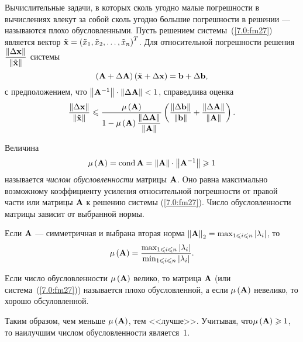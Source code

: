 \documentclass[12pt]{article}
\DeclareMathOperator{\cond}{cond}
\newcommand{\norm}[1]{\left\| #1 \right\|}
\begin{document}
	Вычислительные задачи, в которых сколь угодно малые погрешности в вычислениях влекут за собой сколь угодно большие погрешности в решении --- называются плохо обусловленными. Пусть решением системы~(\ref{7.0:fm27}) является вектор $\tilde{\bold{x}}=\left(\tilde{x}_1, \tilde{x}_2,\ldots, \tilde{x}_n\right)^T$. Для относительной погрешности решения $\dfrac{\norm{\Delta\bold{x}}}{\norm{\tilde{\bold{x}}}}$ системы
	\begin{equation}
		\left(\bold{A}+\Delta\bold{A}\right)\left(\tilde{\bold{x}}+\Delta \bold{x}\right)=\bold{b}+\Delta\bold{b},
	\end{equation}
	с предположением, что $\norm{\bold{A}^{-1}}\cdot\norm{\Delta\bold{A}}<1$,
	справедлива оценка
	\begin{equation}
		\dfrac{\norm{\Delta \bold{x}}}{\norm{\tilde{\bold{x}}}}\leqslant\dfrac{\mu\left(\bold{A}\right)}{1-\mu\left(\bold{A}\right)\dfrac{\norm{\Delta \bold{A}}}{\norm{\bold{A}}}}\left(\dfrac{\norm{\Delta \bold{b}}}{\norm{\bold{b}}}+\dfrac{\norm{\Delta \bold{A}}}{\norm{\bold{A}}}\right).
	\end{equation}
	
	Величина
	\begin{equation}
		\mu\left(\bold{A}\right)=\cond \bold{A}=\norm{\bold{A}}\cdot\norm{\bold{A}^{-1}}\geqslant 1
	\end{equation}
	называется \emph{числом обусловленности} матрицы $\bold{A}$. Оно равна максимально возможному коэффициенту усиления относительной погрешности от правой части или матрицы $\bold{A}$ к решению системы (\ref{7.0:fm27}). Число обусловленности матрицы зависит от выбранной нормы.
	
	Если $\bold{A}$ --- симметричная и выбрана вторая норма $\norm{\bold{A}}_2=\max_{1\leqslant i \leqslant n }\left|\lambda_i\right|$, то
	\begin{equation}
		\mu\left(\bold{A}\right)=\frac{\max_{1\leqslant i \leqslant n }\left|\lambda_i\right|}{\min_{1\leqslant i \leqslant n }\left|\lambda_i\right|}.
	\end{equation}
	
	Если число обусловленности $\mu\left(\bold{A}\right)$ велико, то матрица $\bold{A}$ (или система~(\ref{7.0:fm27})) называется плохо обусловленной, а если $\mu\left(\bold{A}\right)$ невелико, то хорошо обсуловленной.
	
	Таким образом, чем меньше $\mu\left(\bold{A} \right)$, тем <<лучше>>. Учитывая, что\linebreak $\mu\left(\bold{A} \right)\geqslant 1$, то наилучшим числом обусловленности является~1.
	
\end{document}
